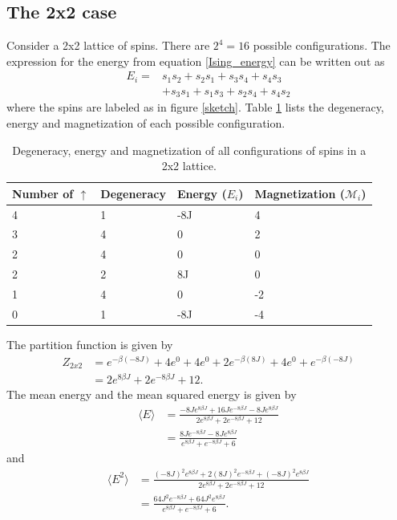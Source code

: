 \documentclass[notitlepage, reprint, nofootinbib]{revtex4-1}
\begin{document}
\subsection{The 2x2 case}
Consider a 2x2 lattice of spins. There are $2^4=16$ possible configurations. The expression for the energy from equation \ref{Ising_energy} can be written out as 
\begin{align}
	E_i = &s_1s_2+s_2s_1+s_3s_4+s_4s_3\nonumber \\
	&+s_3s_1+s_1s_3+s_2s_4+s_4s_2\label{Ising_energy_2x2}
\end{align}
where the spins are labeled as in figure \ref{sketch}. Table \ref{2x2_table} lists the degeneracy, energy and magnetization of each possible configuration. 
\begin{table}[]
\centering
\begin{tabular}{|l|l|l|l|}
\hline
Number of $\uparrow$ & Degeneracy & Energy ($E_i$) & Magnetization ($\mathcal{M}_i$) \\ \hline
4 & 1 & -8J & 4 \\ \hline
3 & 4 & 0 & 2 \\ \hline
2 & 4 & 0 & 0 \\ \hline
2 & 2 & 8J & 0 \\ \hline
1 & 4 & 0 & -2 \\ \hline
0 & 1 & -8J & -4 \\ \hline
\end{tabular}
\caption{Degeneracy, energy and magnetization of all configurations of spins in a 2x2 lattice.}
\label{2x2_table}
\end{table}
The partition function is given by 
\begin{align*}
	Z_{2x2}&=e^{-\beta(-8J)}+4e^0+4e^0+2e^{-\beta(8J)}+4e^0+e^{-\beta(-8J)}\\
	&= 2e^{8\beta J}+2e^{-8\beta J}+12.
\end{align*}
The mean energy and the mean squared energy is given by 
\begin{align*}
	\langle E\rangle&=\frac{-8Je^{8\beta J}+16Je^{-8\beta J}-8Je^{8\beta J}}{2e^{8\beta J}+2e^{-8\beta J}+12}\\
	&=\frac{8Je^{-8\beta J} - 8Je^{8\beta J}}{e^{8\beta J}+e^{-8\beta J}+6}
\end{align*}
and 
\begin{align*}
	\langle E^2\rangle &=\frac{(-8J)^2e^{8\beta J}+2(8J)^2e^{-8\beta J}+(-8J)^2e^{8\beta J}}{2e^{8\beta J}+2e^{-8\beta J}+12}\\
	&=\frac{64J^2e^{-8\beta J} + 64J^2e^{8\beta J}}{e^{8\beta J}+e^{-8\beta J}+6}.
\end{align*}
\end{document}
